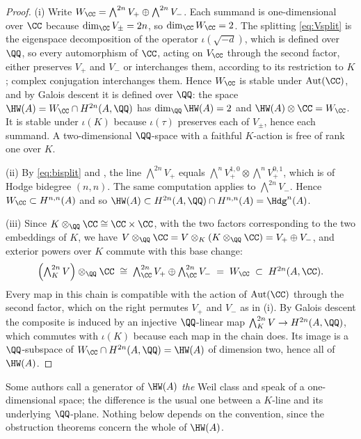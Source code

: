 \begin{proof}
(i) Write $W_{\CC}=\bigwedge^{2n}V_{+}\oplus\bigwedge^{2n}V_{-}$. Each summand
is one-dimensional over $\CC$ because $\dim_{\CC}V_{\pm}=2n$, so
$\dim_{\CC}W_{\CC}=2$. The splitting \eqref{eq:Vsplit} is the eigenspace
decomposition of the operator $\iota(\sqrt{-d})$, which is defined over $\QQ$,
so every automorphism of $\CC$, acting on $V_{\CC}$ through the second
factor, either preserves $V_{+}$ and $V_{-}$ or interchanges them, according
to its restriction to $K$; complex conjugation interchanges them. Hence
$W_{\CC}$ is stable under $\mathrm{Aut}(\CC)$, and by Galois descent it is
defined over $\QQ$: the space $\HW(A)=W_{\CC}\cap H^{2n}(A,\QQ)$ has
$\dim_{\QQ}\HW(A)=2$ and $\HW(A)\otimes\CC=W_{\CC}$. It is stable under $\iota(K)$ because
$\iota(\tau)$ preserves each of $V_{\pm}$, hence each summand. A
two-dimensional $\QQ$-space with a faithful $K$-action is free of rank one
over $K$.

(ii) By \eqref{eq:bisplit} and , the line
$\bigwedge^{2n}V_{+}$ equals
$\bigwedge^{n}V^{1,0}_{+}\otimes\bigwedge^{n}V^{0,1}_{+}$, which is of Hodge
bidegree $(n,n)$. The same computation applies to $\bigwedge^{2n}V_{-}$.
Hence $W_{\CC}\subset H^{n,n}(A)$ and so
$\HW(A)\subset H^{2n}(A,\QQ)\cap H^{n,n}(A)=\Hdg^{n}(A)$.

(iii) Since $K\otimes_{\QQ}\CC\cong\CC\times\CC$, with the two factors
corresponding to the two embeddings of $K$, we have
$V\otimes_{\QQ}\CC=V\otimes_{K}(K\otimes_{\QQ}\CC)=V_{+}\oplus V_{-}$, and
exterior powers over $K$ commute with this base change:
\[
  \Bigl(\textstyle\bigwedge^{2n}_{K}V\Bigr)\otimes_{\QQ}\CC
  \;\cong\;\textstyle\bigwedge^{2n}_{\CC}V_{+}\oplus\bigwedge^{2n}_{\CC}V_{-}
  \;=\;W_{\CC}\;\subset\;H^{2n}(A,\CC).
\]
Every map in this chain is compatible with the action of $\mathrm{Aut}(\CC)$
through the second factor, which on the right permutes $V_{+}$ and $V_{-}$ as in (i).
By Galois descent the composite is induced by an injective $\QQ$-linear map
$\bigwedge^{2n}_{K}V\to H^{2n}(A,\QQ)$, which commutes with $\iota(K)$ because
each map in the chain does. Its image is a $\QQ$-subspace of
$W_{\CC}\cap H^{2n}(A,\QQ)=\HW(A)$ of dimension two, hence all of $\HW(A)$.
\end{proof}

\begin{remark}\label{rem:onedim}
Some authors call a generator of $\HW(A)$ \emph{the} Weil class and speak of a
one-dimensional space; the difference is the usual one between a $K$-line and
its underlying $\QQ$-plane. Nothing below depends on the convention, since
the obstruction theorems concern the whole of $\HW(A)$.
\end{remark}

